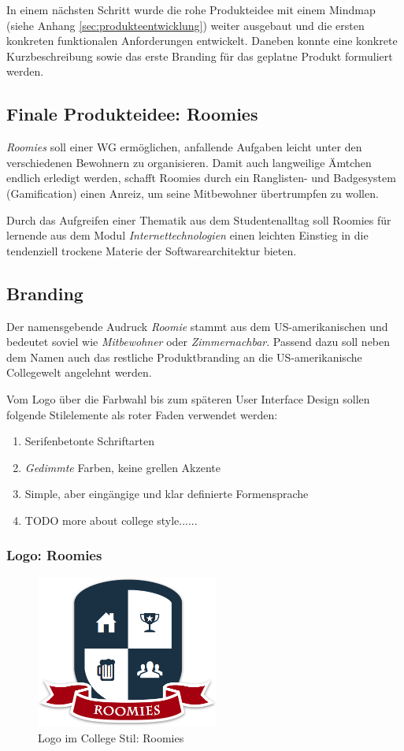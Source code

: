 In einem nächsten Schritt wurde die rohe Produkteidee mit einem Mindmap (siehe Anhang \ref{sec:produkteentwicklung}) weiter ausgebaut und die ersten konkreten funktionalen Anforderungen entwickelt. Daneben konnte eine konkrete Kurzbeschreibung sowie das erste Branding für das geplatne Produkt formuliert werden.

\subsection{Finale Produkteidee: Roomies}
\emph{Roomies} soll einer \gls{WG} ermöglichen, anfallende Aufgaben leicht unter den verschiedenen Bewohnern zu organisieren. Damit auch langweilige Ämtchen endlich erledigt werden, schafft Roomies durch ein Ranglisten- und Badgesystem (\gls{Gamification}) einen Anreiz, um seine Mitbewohner übertrumpfen zu wollen.

Durch das Aufgreifen einer Thematik aus dem Studentenalltag soll Roomies für lernende aus dem Modul \emph{Internettechnologien} einen leichten Einstieg in die tendenziell trockene Materie der Softwarearchitektur bieten.

\subsection{Branding}
Der namensgebende Audruck \emph{Roomie} stammt aus dem US-amerikanischen und bedeutet soviel wie \emph{Mitbewohner} oder \emph{Zimmernachbar}\cite{Roomie}. Passend dazu soll neben dem Namen auch das restliche Produktbranding an die US-amerikanische Collegewelt angelehnt werden.

Vom Logo über die Farbwahl bis zum späteren User Interface Design sollen folgende Stilelemente als roter Faden verwendet werden:

\begin{enumerate}
	\item Serifenbetonte Schriftarten
	\item \emph{Gedimmte} Farben, keine grellen Akzente
	\item Simple, aber eingängige und klar definierte Formensprache
	\item TODO more about college style...... %
\end{enumerate}

\subsubsection*{Logo: Roomies}
\begin{figure}[H]
	\centering
	\includegraphics[width=6cm]{content/images/roomies-withshadow.png}
	\caption{Logo im College Stil: Roomies}
\end{figure}

